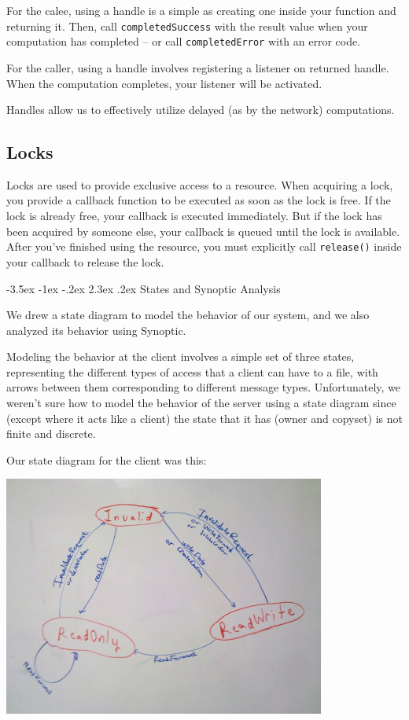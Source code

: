 \documentclass[12pt]{article}	%
\makeatletter
\renewcommand\section{\@startsection{section}{1}{\z@}%
                                 {-3.5ex \@plus -1ex \@minus -.2ex}%
                                 {2.3ex \@plus.2ex}%
                                 {\normalfont\large\bfseries}}
\makeatother
\begin{document}
For the calee, using a handle is a simple as creating one inside your function and returning it. Then, call \texttt{completedSuccess} with the result value when your computation has completed -- or call \texttt{completedError} with an error code.

For the caller, using a handle involves registering a listener on returned handle. When the computation completes, your listener will be activated.

Handles allow us to effectively utilize delayed (as by the network) computations.

\subsection{Locks}

Locks are used to provide exclusive access to a resource. When acquiring a lock, you provide a callback function to be executed as soon as the lock is free. If the lock is already free, your callback is executed immediately. But if the lock has been acquired by someone else, your callback is queued until the lock is available. After you've finished using the resource, you must explicitly call \texttt{release()} inside your callback to release the lock.

\pagebreak

\section{States and Synoptic Analysis}

We drew a state diagram to model the behavior of our system, and we also analyzed its behavior using Synoptic.

Modeling the behavior at the client involves a simple set of three states, representing the different types of access that a client can have to a file, with arrows between them corresponding to different message types. Unfortunately, we weren't sure how to model the behavior of the server using a state diagram since (except where it acts like a client) the state that it has (owner and copyset) is not finite and discrete.

Our state diagram for the client was this:

\includegraphics[width=400px]{drawn_diagram_min.jpg}
\end{document}
